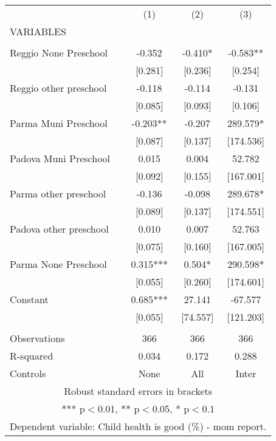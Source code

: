 \begin{tabular}{lccc} \hline
 & (1) & (2) & (3) \\
VARIABLES &  &  &  \\ \hline
 &  &  &  \\
Reggio None Preschool & -0.352 & -0.410* & -0.583** \\
 & [0.281] & [0.236] & [0.254] \\
Reggio other preschool & -0.118 & -0.114 & -0.131 \\
 & [0.085] & [0.093] & [0.106] \\
Parma Muni Preschool & -0.203** & -0.207 & 289.579* \\
 & [0.087] & [0.137] & [174.536] \\
Padova Muni Preschool & 0.015 & 0.004 & 52.782 \\
 & [0.092] & [0.155] & [167.001] \\
Parma other preschool & -0.136 & -0.098 & 289.678* \\
 & [0.089] & [0.137] & [174.551] \\
Padova other preschool & 0.010 & 0.007 & 52.763 \\
 & [0.075] & [0.160] & [167.005] \\
Parma None Preschool & 0.315*** & 0.504* & 290.598* \\
 & [0.055] & [0.260] & [174.601] \\
Constant & 0.685*** & 27.141 & -67.577 \\
 & [0.055] & [74.557] & [121.203] \\
 &  &  &  \\
Observations & 366 & 366 & 366 \\
R-squared & 0.034 & 0.172 & 0.288 \\
 Controls & None & All & Inter \\ \hline
\multicolumn{4}{c}{ Robust standard errors in brackets} \\
\multicolumn{4}{c}{ *** p$<$0.01, ** p$<$0.05, * p$<$0.1} \\
\multicolumn{4}{c}{ Dependent variable: Child health is good (\%) - mom report.} \\
\end{tabular}
